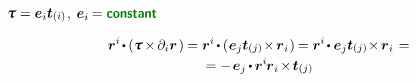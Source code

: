\begin{otherlanguage}{russian}
\noindent
${\cauchystress = \bm{e}_{i} \tractionvector{i}\hspace{.12ex}}$, ${\bm{e}_i \hspace{-0.16ex} = \boldconstant}$

\nopagebreak\vspace{-0.2em}\begin{multline*}
\currentlocationvector^{i} \hspace{-0.25ex} \dotp \hspace{-0.1ex} \left( \cauchystress \hspace{-0.2ex} \times \hspace{-0.2ex} \partial_i \currentlocationvector \hspace{.24ex} \right) \hspace{-0.1ex}
= \currentlocationvector^{i} \hspace{-0.2ex} \dotp \hspace{-0.1ex} \left( \hspace{.1ex} \bm{e}_{j} \tractionvector{j} \hspace{-0.2ex} \times \hspace{-0.2ex} \currentlocationvector_{\hspace{.1ex}i} \hspace{.12ex} \right) \hspace{-0.16ex}
= \currentlocationvector^{i} \hspace{-0.25ex} \dotp \bm{e}_{j} \tractionvector{j} \hspace{-0.2ex} \times \hspace{-0.2ex} \currentlocationvector_{\hspace{.1ex}i} \hspace{.2ex} =
\\[-0.15em]
= - \hspace{.25ex} \bm{e}_{j} \hspace{-0.15ex} \dotp \hspace{-0.1ex} \currentlocationvector^{i} \hspace{-0.2ex} \currentlocationvector_{\hspace{.1ex}i} \hspace{-0.25ex} \times \hspace{-0.25ex} \tractionvector{j}

\end{multline*}
\end{otherlanguage}
